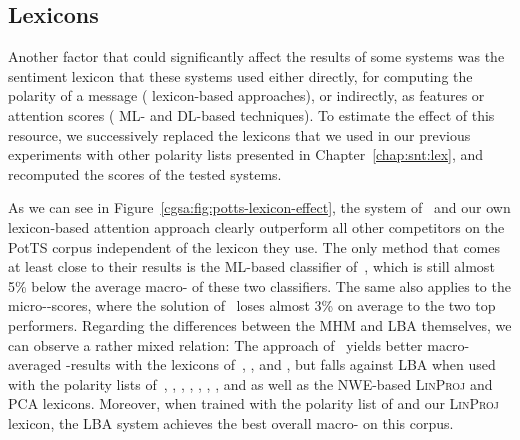 \subsection{Lexicons}\label{cgsa:subsec:eval:lexicons}

Another factor that could significantly affect the results of some
systems was the sentiment lexicon that these systems used either
directly, for computing the polarity of a message (\eg{} lexicon-based
approaches), or indirectly, as features or attention scores (\eg{} ML-
and DL-based techniques).  To estimate the effect of this resource, we
successively replaced the lexicons that we used in our previous
experiments with other polarity lists presented in
Chapter~\ref{chap:snt:lex}, and recomputed the scores of the tested
systems.

As we can see in Figure~\ref{cgsa:fig:potts-lexicon-effect}, the
system of~\citet{Mohammad:13} and our own lexicon-based attention
approach clearly outperform all other competitors on the PotTS corpus
independent of the lexicon they use.  The only method that comes at
least close to their results is the ML-based classifier
of~\citet{Guenther:14}, which is still almost 5\% below the average
macro-\F{} of these two classifiers.  The same also applies to the
micro-\F-scores, where the solution of~\citet{Guenther:14} loses
almost 3\% on average to the two top performers.  Regarding the
differences between the MHM and LBA themselves, we can observe a
rather mixed relation: The approach of~\citet{Mohammad:13} yields
better macro-averaged \F{}-results with the lexicons
of~\citet{Esuli:05}, \citet{Vo:16}, and \citet{Clematide:10}, but
falls against LBA when used with the polarity lists
of~\citet{Blair-Goldensohn:08}, \citet{Waltinger:10}, \citet{Hu:04},
\citet{Kiritchenko:14}, \citet{Rao:09}, \citet{Takamura:05},
\citet{Tang:14}, and \citet{Velikovich:10} as well as the NWE-based
\textsc{LinProj} and \textsc{PCA} lexicons.  Moreover, when trained
with the polarity list of \citeauthor{Tang:14} and our
\textsc{LinProj} lexicon, the LBA system achieves the best overall
macro-\F{} on this corpus.

